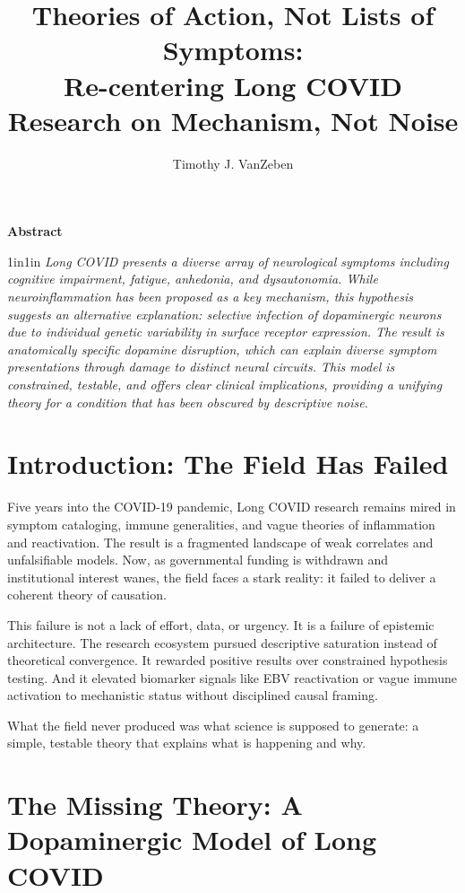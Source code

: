 \documentclass[12pt]{article}
\title{\textbf{Theories of Action, Not Lists of Symptoms:\\Re-centering Long COVID Research on Mechanism, Not Noise}}
\author{Timothy J. VanZeben}
\date{}
\begin{document}
\maketitle

\begin{center}
\textbf{Abstract}
\end{center}

\begin{adjustwidth}{1in}{1in}
\small\itshape
Long COVID presents a diverse array of neurological symptoms including cognitive impairment, fatigue, anhedonia, and dysautonomia. While neuroinflammation has been proposed as a key mechanism, this hypothesis suggests an alternative explanation: selective infection of dopaminergic neurons due to individual genetic variability in surface receptor expression. The result is anatomically specific dopamine disruption, which can explain diverse symptom presentations through damage to distinct neural circuits. This model is constrained, testable, and offers clear clinical implications, providing a unifying theory for a condition that has been obscured by descriptive noise.
\end{adjustwidth}

\section*{Introduction: The Field Has Failed}

Five years into the COVID-19 pandemic, Long COVID research remains mired in symptom cataloging, immune generalities, and vague theories of inflammation and reactivation. The result is a fragmented landscape of weak correlates and unfalsifiable models. Now, as governmental funding is withdrawn and institutional interest wanes, the field faces a stark reality: it failed to deliver a coherent theory of causation.

This failure is not a lack of effort, data, or urgency. It is a failure of epistemic architecture. The research ecosystem pursued descriptive saturation instead of theoretical convergence. It rewarded positive results over constrained hypothesis testing. And it elevated biomarker signals like EBV reactivation or vague immune activation to mechanistic status without disciplined causal framing.

What the field never produced was what science is supposed to generate: a simple, testable theory that explains what is happening and why.

\section*{The Missing Theory: A Dopaminergic Model of Long COVID}
\end{document}
